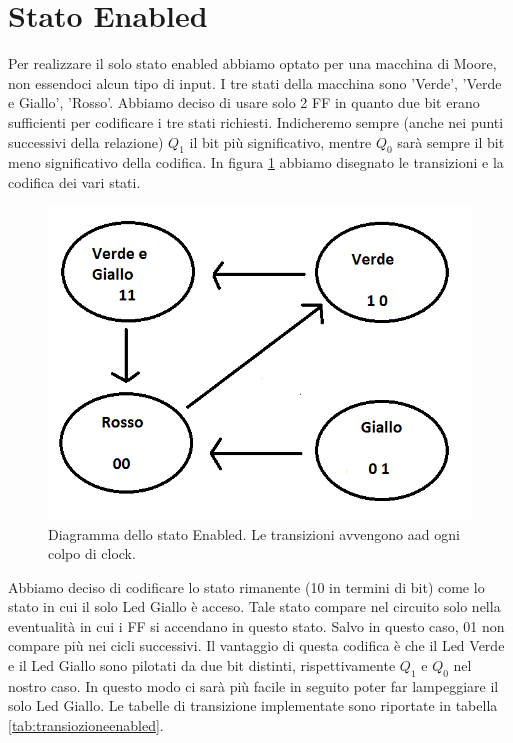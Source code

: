 \documentclass[10pt,a4paper]{article}
\begin{document}
\section{Stato Enabled}
Per realizzare il solo stato enabled abbiamo optato per una macchina di Moore, non essendoci alcun tipo di input. I tre stati della macchina sono 'Verde', 'Verde e Giallo', 'Rosso'. Abbiamo deciso di usare solo 2 FF in quanto due bit erano sufficienti per codificare i tre stati richiesti. Indicheremo sempre (anche nei punti successivi della relazione) $Q_1$ il bit più significativo, mentre $Q_0$ sarà sempre il bit meno significativo della codifica. In figura \ref{fig:FSMenabled} abbiamo disegnato le transizioni e la codifica dei vari stati.
\begin{figure}[!htb]
\centering
\includegraphics[scale=0.7]{FSMenabled.png}
\caption{Diagramma dello stato Enabled. Le transizioni avvengono aad ogni colpo di clock.\label{fig:FSMenabled}}
\end{figure}
Abbiamo deciso di codificare lo stato rimanente (10 in termini di bit) come lo stato in cui il solo Led Giallo è acceso. Tale stato compare nel circuito solo nella eventualità in cui i FF si accendano in questo stato. Salvo in questo caso, 01 non compare più nei cicli successivi.
Il vantaggio di questa codifica è che il Led Verde e il Led Giallo sono pilotati da due bit distinti, rispettivamente $Q_1$ e $Q_0$ nel nostro caso. In questo modo ci sarà più facile in seguito poter far lampeggiare il solo Led Giallo.
Le tabelle di transizione implementate sono riportate in tabella \ref{tab:transiozioneenabled}.
\end{document}
